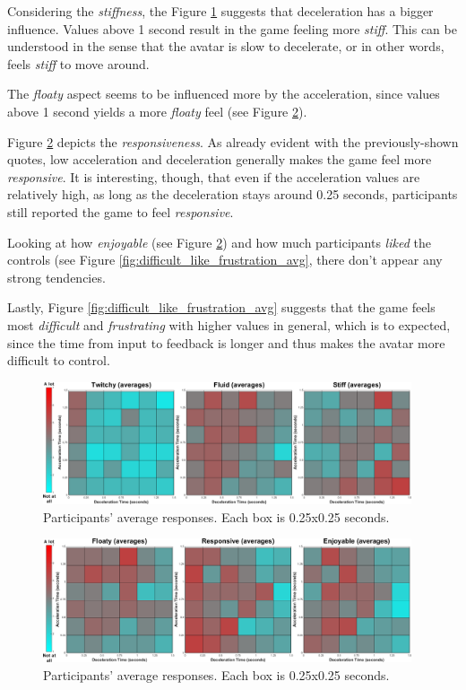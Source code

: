 Considering the \textit{stiffness}, the Figure \ref{fig:twitchy_fluid_stiff_avg} suggests that deceleration has a bigger influence. Values above 1 second result in the game feeling more \textit{stiff}. This can be understood in the sense that the avatar is slow to decelerate, or in other words, feels \textit{stiff} to move around.

The \textit{floaty} aspect seems to be influenced more by the acceleration, since values above 1 second yields a more \textit{floaty} feel (see Figure \ref{fig:floaty_responsive_enjoyable_avg}).

Figure \ref{fig:floaty_responsive_enjoyable_avg} depicts the \textit{responsiveness}. As already evident with the previously-shown quotes, low acceleration and deceleration generally makes the game feel more \textit{responsive}. It is interesting, though, that even if the acceleration values are relatively high, as long as the deceleration stays around 0.25 seconds, participants still reported the game to feel \textit{responsive}.

Looking at how \textit{enjoyable} (see Figure \ref{fig:floaty_responsive_enjoyable_avg}) and how much participants \textit{liked} the controls (see Figure \ref{fig:difficult_like_frustration_avg}, there don't appear any strong tendencies.

Lastly, Figure \ref{fig:difficult_like_frustration_avg} suggests that the game feels most \textit{difficult} and \textit{frustrating} with higher values in general, which is to expected, since the time from input to feedback is longer and thus makes the avatar more difficult to control.

\begin{figure}[!htb]
\centering
\includegraphics[width=0.97\textwidth]{Pics/Classes/averages/twitchy_fluid_stiff_avg}
\caption{Participants' average responses. Each box is 0.25x0.25 seconds.}
\label{fig:twitchy_fluid_stiff_avg}
\end{figure}

\begin{figure}[!htb]
\centering
\includegraphics[width=0.97\textwidth]{Pics/Classes/averages/floaty_responsive_enjoyable_avg.png}
\caption{Participants' average responses. Each box is 0.25x0.25 seconds.}
\label{fig:floaty_responsive_enjoyable_avg}
\end{figure}

